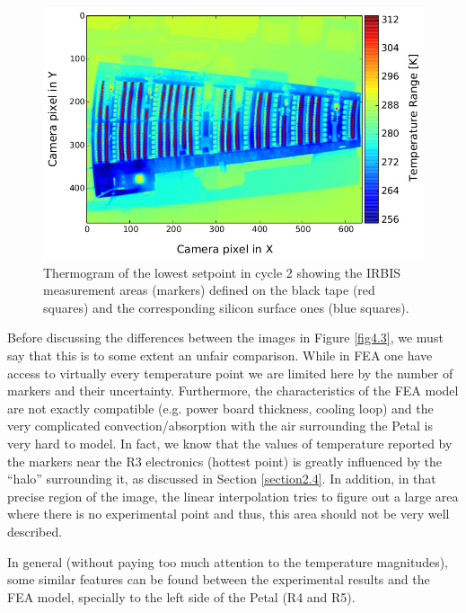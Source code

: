 		\begin{figure}[ht!]
			\centering
			\captionsetup{justification=centering,margin=2cm}
			\includegraphics[scale=0.39]{Figures/Chapter04/thermo_Temp_20170803154926.jpg}
			\caption{Thermogram of the lowest setpoint in cycle 2 showing the IRBIS measurement areas (markers) defined on the black tape (red squares) and the corresponding silicon surface ones (blue squares).}\label{fig4.2}
		\end{figure}
	
		Before discussing the differences between the images in Figure \ref{fig4.3}, we must say that this is to some extent an unfair comparison. While in FEA one have access to virtually every temperature point we are limited here by the number of markers and their uncertainty. Furthermore, the characteristics of the FEA model are not exactly compatible (e.g. power board thickness, cooling loop) and the very complicated convection/absorption with the air surrounding the Petal is very hard to model. In fact, we know that the values of temperature reported by the markers near the R3 electronics (hottest point) is greatly influenced by the “halo” surrounding it, as discussed in Section \ref{section2.4}. In addition, in that precise region of the image, the linear interpolation tries to figure out a large area where there is no experimental point and thus, this area should not be very well described.
		
		In general (without paying too much attention to the temperature magnitudes), some similar features can be found between the experimental results and the FEA model, specially to the left side of the Petal (R4 and R5).
		
